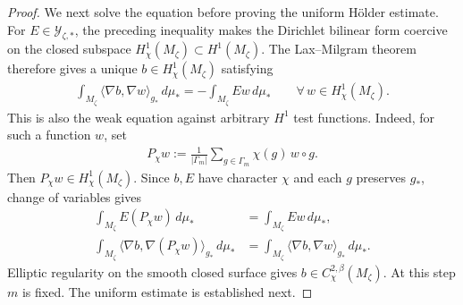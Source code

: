 \documentclass[a4paper,11pt,oneside,reqno]{amsart}
\numberwithin{equation}{section}
\theoremstyle{definition}
\begin{document}
\begin{proof}
    We next solve the equation before proving the
    uniform H\"older estimate. For
    $E\in\mathcal Y_{\zeta,*}$, the preceding
    inequality makes the Dirichlet bilinear form
    coercive on the closed subspace
    $H^1_\chi(M_\zeta)\subset H^1(M_\zeta)$.
    The Lax--Milgram theorem therefore gives a unique
    $b\in H^1_\chi(M_\zeta)$ satisfying
    \begin{align*}
        \int_{M_\zeta}
             \langle\nabla b,\nabla w\rangle_{g_*}\,d\mu_*
        =-\int_{M_\zeta}Ew\,d\mu_*
        \qquad\forall\,w\in H^1_\chi(M_\zeta).
    \end{align*}
    This is also the weak equation against arbitrary
    $H^1$ test functions. Indeed, for such a function
    $w$, set
    \begin{align*}
        P_\chi w
        :=\frac1{|\Gamma_m|}
          \sum_{g\in\Gamma_m}\chi(g)\,w\circ g.
    \end{align*}
    Then $P_\chi w\in H^1_\chi(M_\zeta)$.
    Since $b,E$ have character $\chi$ and each $g$
    preserves $g_*$, change of variables gives
    \begin{align*}
        \int_{M_\zeta}E(P_\chi w)\,d\mu_*
        &=\int_{M_\zeta}Ew\,d\mu_*,\\
        \int_{M_\zeta}
          \langle\nabla b,\nabla(P_\chi w)\rangle_{g_*}
                 \,d\mu_*
        &=\int_{M_\zeta}
          \langle\nabla b,\nabla w\rangle_{g_*}\,d\mu_*.
    \end{align*}
    Elliptic regularity on the smooth closed surface
    gives $b\in C^{2,\beta}_\chi(M_\zeta)$.
    At this step $m$ is fixed. The uniform estimate
    is established next.


\end{proof}
\end{document}
